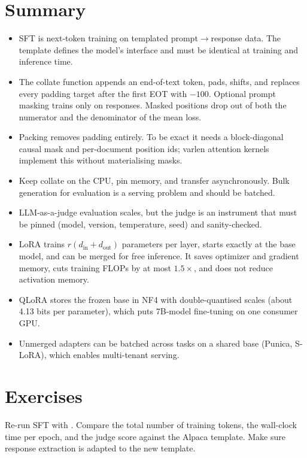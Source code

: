 \section{Summary}\label{sec:instruct:summary}
\begin{itemize}
\item SFT is next-token training on templated prompt$\to$response data. The template
defines the model's interface and must be identical at training and inference time.
\item The collate function appends an end-of-text token, pads, shifts, and replaces
every padding target after the first EOT with $-100$. Optional prompt masking trains
only on responses. Masked positions drop out of both the numerator and the denominator
of the mean loss.
\item Packing removes padding entirely. To be exact it needs a block-diagonal causal
mask and per-document position ids; varlen attention kernels implement this without
materialising masks.
\item Keep collate on the CPU, pin memory, and transfer asynchronously. Bulk
generation for evaluation is a serving problem and should be batched.
\item LLM-as-a-judge evaluation scales, but the judge is an instrument that must be
pinned (model, version, temperature, seed) and sanity-checked.
\item LoRA trains $r(d_\text{in}+d_\text{out})$ parameters per layer, starts exactly at
the base model, and can be merged for free inference. It saves optimizer and gradient
memory, cuts training FLOPs by at most $1.5\times$, and does not reduce activation
memory.
\item QLoRA stores the frozen base in NF4 with double-quantised scales (about 4.13
bits per parameter), which puts 7B-model fine-tuning on one consumer GPU.
\item Unmerged adapters can be batched across tasks on a shared base (Punica, S-LoRA),
which enables multi-tenant serving.
\end{itemize}

\section{Exercises}\label{sec:instruct:exercises}

\begin{exercise}
Re-run SFT with . Compare the total number of training tokens, the
wall-clock time per epoch, and the judge score against the Alpaca template. Make sure
response extraction is adapted to the new template.
\end{exercise}

